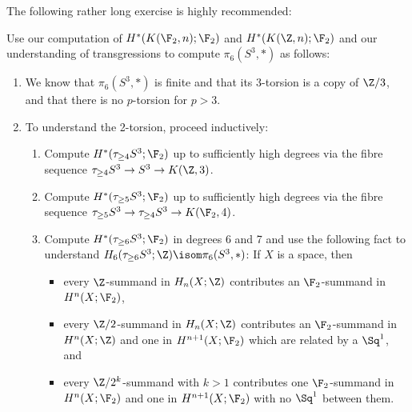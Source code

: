The following rather long exercise is highly recommended:
\begin{exercise}
	Use our computation of $H^*(K(\F_2, n); \F_2)$ and $H^*(K(\Z, n); \F_2)$ and our understanding of transgressions to compute $\pi_6(S^3, *)$ as follows:
	\begin{enumerate}
		\item We know that $\pi_6(S^3, *)$ is finite and that its 3-torsion is a copy of $\Zn{3}$, and that there is no $p$-torsion for $p > 3$.
		\item To understand the 2-torsion, proceed inductively:
			\begin{enumerate}
				\item Compute $H^*(\tau_{\geq 4} S^3; \F_2)$ up to sufficiently high degrees via the fibre sequence $\tau_{\geq 4} S^3 \to S^3 \to K(\Z, 3)$.
				\item Compute $H^*(\tau_{\geq 5} S^3; \F_2)$ up to sufficiently high degrees via the fibre sequence $\tau_{\geq 5} S^3 \to \tau_{\geq 4} S^3 \to K(\F_2, 4)$.
				\item Compute $H^*(\tau_{\geq 6} S^3; \F_2)$ in degrees 6 and 7 and use the following fact to understand $H_6(\tau_{\geq 6} S^3; \Z) \isom \pi_6(S^3, *)$:
					If $X$ is a space, then
					\begin{itemize}
						\item every $\Z$-summand in $H_n(X; \Z)$ contributes an $\F_2$-summand in $H^n(X; \F_2)$,
						\item every $\Zn{2}$-summand in $H_n(X; \Z)$ contributes an $\F_2$-summand in $H^n(X; \Z)$ and one in $H^{n + 1}(X; \F_2)$ which are related by a $\Sq^1$, and
						\item every $\Zn{2^k}$-summand with $k > 1$ contributes one $\F_2$-summand in $H^n(X; \F_2)$ and one in $H^{n + 1}(X; \F_2)$ with no $\Sq^1$ between them.
					\end{itemize}
			\end{enumerate}
	\end{enumerate}
\end{exercise}
